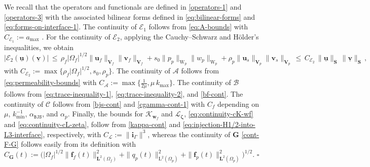 \documentclass[11pt]{article}
\numberwithin{equation}{section}
\newcommand{\bzeta}{{\boldsymbol\zeta}}
\newcommand{\ubu}{\underline{\bu}}
\newcommand{\ubv}{\underline{\bv}}
\newcommand{\bv}{{\mathbf{v}}}
\newcommand{\bw}{{\mathbf{w}}}
\newcommand{\f}{\mathbf{f}}
\newcommand{\bi}{\mathbf{i}}
\newcommand{\bu}{\mathbf{u}}
\newcommand{\0}{{\mathbf{0}}}
\def\bG{\mathbf{G}}
\def\bV{\mathbf{V}}
\def\bS{\mathbf{S}}
\newcommand{\bL}{\mathbf{L}}
\newcommand{\cA}{\mathcal{A}}
\newcommand{\cB}{\mathcal{B}}
\newcommand{\cC}{\mathcal{C}}
\newcommand{\cE}{\mathcal{E}}
\newcommand{\cK}{\mathcal{K}}
\newcommand{\cL}{\mathcal{L}}
\def\L{\mathrm{L}}
\def\W{\mathrm{W}}
\def\BJS{\mathtt{BJS}}
\newenvironment{proof}{\noindent{\it Proof.}}{\hfill$\square$}
\numberwithin{equation}{section}
\begin{document}
\begin{proof}
We recall that the operators and functionals are defined in \eqref{operators-1} and \eqref{operators-3} with the associated bilinear forms defined in \eqref{eq:bilinear-forms} and \eqref{eq:forms-on-interface-1}. The continuity of $\cE_1$ follows from \eqref{eq:A-bounds} with $C_{\cE_1}:= a_{\max}$  . For the continuity of $\cE_2$, applying the Cauchy--Schwarz and H\"older's inequalities, we obtain
\begin{equation*}%
\big|\cE_2(\ubu)(\ubv)\big| 
\,\leq\, \rho_f |\Omega_f|^{1/2}\|\bu_f\|_{\bV_f}\|\bv_f\|_{\bV_f} 
+ s_0\|p_p\|_{\W_p}\|w_p\|_{\W_p} 
+ \rho_p \|\bu_s\|_{\bV_p}\|\bv_s\|_{\bV_p}
\,\leq\, C_{\cE_2}\,\|\ubu\|_\bS\,\|\ubv\|_\bS \,,
\end{equation*}
with $C_{\cE_2}:=\max\{\rho_f|\Omega_f|^{1/2},s_0,\rho_p\}$. The continuity of $\cA$ follows from \eqref{eq:permeability-bounds} with $C_{\cA}:=\max\{ \frac{1}{2\mu}, \mu\,k_{\max}\}$.
The continuity of $\cB$ follows from \eqref{eq:trace-inequality-1}, \eqref{eq:trace-inequality-2}, and \eqref{bf-cont}. The continuity of $\cC$ follows from \eqref{bjs-cont} and \eqref{cgamma-cont-1} with $C_f$ depending on $\mu$, $k_{\min}^{-1}$, $\alpha_{\BJS}$, and $\alpha_p$. Finally, the bounds for $\cK_{\bw_f}$ and $\cL_{\bzeta}$,  \eqref{eq:continuity-cK-wf} and \eqref{eq:continuity-cL-zeta}, follow from \eqref{kappa-cont} and \eqref{eq:injection-H1/2-into-L3-interface}, respectively, with $C_{\cL}:= \|\bi_{\Gamma}\|^3$, whereas the continuity of $\bG$ \eqref{cont-F-G} follows easily from its definition with $C_{\bG}(t) := \big(|\Omega_f|^{1/2}\|\f_f(t)\|^2_{\bL^2(\Omega_f)} + \|q_p(t)\|_{\L^2(\Omega_p)}^2 + \|\f_p(t)\|^2_{\bL^2(\Omega_p)}\big)^{1/2}$.
\end{proof}
\end{document}
